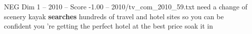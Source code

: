 \begin{textsample}{NEG Dim 1 – 2010 – Score -1.00 – 2010/tv\_com\_2010\_59.txt}  \label{ex:f1_neg_040}
need a change of scenery kayak \textbf{searches} hundreds of travel and hotel sites so you can be confident you 're getting the perfect hotel at the best price soak it in

\end{textsample}
